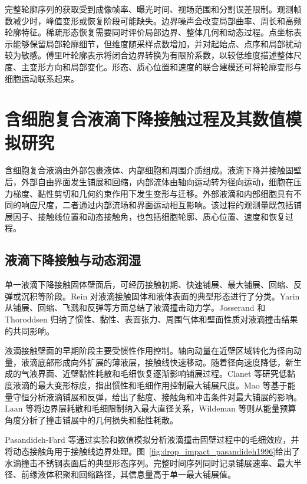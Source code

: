 完整轮廓序列的获取受到成像帧率、曝光时间、视场范围和分割误差限制。观测帧数减少时，峰值变形或恢复阶段可能缺失。边界噪声会改变局部曲率、周长和高频轮廓特征。稀疏形态恢复需要同时评价局部边界、整体几何和动态过程。点坐标表示能够保留局部轮廓细节，但维度随采样点数增加，并对起始点、点序和局部扰动较为敏感。傅里叶轮廓表示将闭合边界转换为有限阶系数，以较低维度描述整体尺度、主变形方向和局部变化\cite{kuhl1982elliptic}。形态、质心位置和速度的联合建模还可将轮廓变形与细胞运动联系起来\cite{caruana1997multitask}。

\section{含细胞复合液滴下降接触过程及其数值模拟研究}

含细胞复合液滴由外部包裹液体、内部细胞和周围介质组成。液滴下降并接触固壁后，外部自由界面发生铺展和回缩，内部流体由轴向运动转为径向运动，细胞在压力梯度、黏性剪切和几何约束作用下发生变形与迁移。外部液滴和内部细胞具有不同的响应尺度，二者通过内部流场和界面运动相互影响\cite{tasoglu2010compound,blanken2021compoundperspective,freund2014bloodcells}。该过程的观测量既包括铺展因子、接触线位置和动态接触角，也包括细胞轮廓、质心位置、速度和恢复过程。

\subsection{液滴下降接触与动态润湿}

单一液滴下降接触固体壁面后，可经历接触初期、快速铺展、最大铺展、回缩、反弹或沉积等阶段。Rein 对液滴接触固体和液体表面的典型形态进行了分类\cite{rein1993impact}。Yarin 从铺展、回缩、飞溅和反弹等方面总结了液滴撞击动力学\cite{yarin2006impact}。Josserand 和 Thoroddsen 归纳了惯性、黏性、表面张力、周围气体和壁面性质对液滴撞击结果的共同影响\cite{josserand2016drop}。

液滴接触壁面的早期阶段主要受惯性作用控制。轴向动量在近壁区域转化为径向动量，液滴底部形成向外扩展的薄液层，接触线快速移动。随着径向速度降低，新生成的气液界面、近壁黏性耗散和毛细恢复逐渐影响铺展过程。Clanet 等研究低黏度液滴的最大变形标度，指出惯性和毛细作用控制最大铺展尺度\cite{clanet2004maximal}。Mao 等基于能量守恒分析液滴铺展和反弹，给出了黏度、接触角和冲击条件对最大铺展的影响\cite{mao1997spread}。Laan 等将边界层耗散和毛细限制纳入最大直径关系\cite{laan2014maximumdiameter}，Wildeman 等则从能量预算角度分析了撞击铺展中的几何损失和黏性耗散\cite{wildeman2016spreading}。

Pasandideh-Fard 等通过实验和数值模拟分析液滴撞击固壁过程中的毛细效应，并将动态接触角用于接触线边界处理\cite{pasandidehfard1996capillary}。图~\ref{fig:drop_impact_pasandideh1996}给出了水滴撞击不锈钢表面后的典型形态序列。完整时间序列同时记录铺展速率、最大半径、前缘液体积聚和回缩路径，其信息量高于单一最大铺展值。

